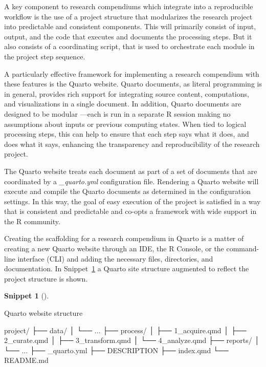 \documentclass[
  letterpaper,
  krantz1]{latex/krantz-mod}
\newenvironment{Shaded}{\begin{snugshade}}{\end{snugshade}}
\newcommand{\ExtensionTok}[1]{\textcolor[rgb]{0.00,0.00,0.00}{#1}}
\newcommand{\NormalTok}[1]{\textcolor[rgb]{0.00,0.00,0.00}{#1}}
\theoremstyle{definition}
\newtheorem{definition}{Snippet}[chapter]
\theoremstyle{definition}
\theoremstyle{remark}
\begin{document}
A key component to research compendiums which integrate into a
reproducible workflow is the use of a project structure that modularizes
the research project into predictable and consistent components. This
will primarily consist of input, output, and the code that executes and
documents the processing steps. But it also consists of a coordinating
script, that is used to orchestrate each module in the project step
sequence.

A particularly effective framework for implementing a research
compendium with these features is the Quarto
website. Quarto documents, as literal
programming is in general, provides rich support for integrating source
content, computations, and visualizations in a single document. In
addition, Quarto documents are designed to be modular ---each is run in
a separate R session making no assumptions about inputs or previous
computing states. When tied to logical processing steps, this can help
to ensure that each step says what it does, and does what it says,
enhancing the transparency and reproducibility of the research project.

The Quarto website treats each document as part of a set of documents
that are coordinated by a \emph{\_quarto.yml} configuration file.
Rendering a Quarto website will execute and compile the Quarto documents
as determined in the configuration settings. In this way, the goal of
easy execution of the project is satisfied in a way that is consistent
and predictable and co-opts a framework with wide support in the R
community.

Creating the scaffolding for a research compendium in Quarto is a matter
of creating a new Quarto website through an IDE, the R Console, or the
command-line interface (CLI) and adding the necessary files,
directories, and documentation. In Snippet~\ref{def-quarto-site} a
Quarto site structure augmented to reflect the project structure is
shown.

\begin{definition}[]\protect\hypertarget{def-quarto-site}{}\label{def-quarto-site}

Quarto website structure

\begin{Shaded}
\begin{Highlighting}[]
\ExtensionTok{project/}
  \ExtensionTok{├──}\NormalTok{ data/}
  \ExtensionTok{│}\NormalTok{   └── ...}
  \ExtensionTok{├──}\NormalTok{ process/}
  \ExtensionTok{│}\NormalTok{   ├── 1\_acquire.qmd}
  \ExtensionTok{│}\NormalTok{   ├── 2\_curate.qmd}
  \ExtensionTok{│}\NormalTok{   ├── 3\_transform.qmd}
  \ExtensionTok{│}\NormalTok{   └── 4\_analyze.qmd}
  \ExtensionTok{├──}\NormalTok{ reports/}
  \ExtensionTok{│}\NormalTok{   └── ...}
  \ExtensionTok{├──}\NormalTok{ \_quarto.yml}
  \ExtensionTok{├──}\NormalTok{ DESCRIPTION}
  \ExtensionTok{├──}\NormalTok{ index.qmd}
  \ExtensionTok{└──}\NormalTok{ README.md}
\end{Highlighting}
\end{Shaded}

\end{definition}
\end{document}
